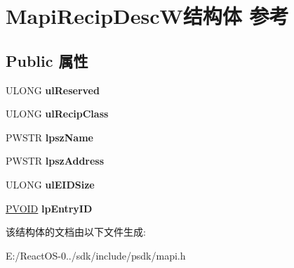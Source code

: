 \hypertarget{struct_mapi_recip_desc_w}{}\section{Mapi\+Recip\+Desc\+W结构体 参考}
\label{struct_mapi_recip_desc_w}
\subsection*{Public 属性}
\begin{DoxyCompactItemize}
\item 
\mbox{\label{struct_mapi_recip_desc_w_ab2f29c1d82a3330523c39ec0eff9f863}} 
U\+L\+O\+NG {\bfseries ul\+Reserved}
\item 
\mbox{\label{struct_mapi_recip_desc_w_aacf96383e61690df014000ddc2649898}} 
U\+L\+O\+NG {\bfseries ul\+Recip\+Class}
\item 
\mbox{\label{struct_mapi_recip_desc_w_aec381e555da7a0f8f63e5e8d84814f75}} 
P\+W\+S\+TR {\bfseries lpsz\+Name}
\item 
\mbox{\label{struct_mapi_recip_desc_w_afd87e284024b121f3ad17b25e4326952}} 
P\+W\+S\+TR {\bfseries lpsz\+Address}
\item 
\mbox{\label{struct_mapi_recip_desc_w_ad378adb8dd901bb7666b3192c8b2f4d5}} 
U\+L\+O\+NG {\bfseries ul\+E\+I\+D\+Size}
\item 
\mbox{\label{struct_mapi_recip_desc_w_aa48bdf289ca406810a45bab142cf6a31}} 
\hyperlink{interfacevoid}{P\+V\+O\+ID} {\bfseries lp\+Entry\+ID}
\end{DoxyCompactItemize}


该结构体的文档由以下文件生成\+:\begin{DoxyCompactItemize}
\item 
E\+:/\+React\+O\+S-\/0../sdk/include/psdk/mapi.\+h\end{DoxyCompactItemize}
